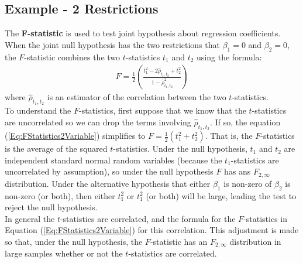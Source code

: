 \subsection{Example - 2 Restrictions}
The \textbf{F-statistic} is used to test joint hypothesis about regression coefficients.\\
When the joint null hypothesis has the two restrictions that $\beta_{1} = 0$ and $\beta_{2} = 0$, the $F$-statistic combines the two $t$-statistics $t_{1}$ and $t_{2}$ using the formula:
\begin{eqnarray}
\label{Eq:FStatistics2Variable}
F = \frac{1}{2}\left(\frac{t_{1}^{2} - 2\hat{\rho}_{t_{1},t_{2}} + t_{2}^{2}}{1  - \hat{\rho}_{t_{1},t_{2}}^{2}}\right)
\end{eqnarray}
where $\hat{\rho}_{t_{1},t_{2}}$ is an estimator of the correlation between the two $t$-statistics.\\
To understand the $F$-statistics, first suppose that we know that the $t$-statistics are uncorrelated so we can drop the terms involving $\hat{\rho}_{t_{1},t_{2}}$. If so, the equation (\ref{Eq:FStatistics2Variable}) simplifies to $F = \frac{1}{2}\left(t_{1}^{2} + t_{2}^{2}\right)$. That is, the $F$-statistics is the average of the squared $t$-statistics. Under the null hypothesis, $t_{1}$ and $t_{2}$ are independent standard normal random variables (because the $t_{1}$-statistics are uncorrelated by assumption), so under the null hypothesis $F$ has ans $F_{2,\infty}$ distribution. Under the alternative hypothesis that either $\beta_{1}$ is non-zero of $\beta_{2}$ is non-zero (or both), then either $t_{1}^{2}$ or $t_{1}^{2}$ (or both) will be large, leading the test to reject the null hypothesis.\\
In general the $t$-statistics are correlated, and the formula for the $F$-statistics in Equation (\ref{Eq:FStatistics2Variable}) for this correlation. This adjustment is made so that, under the null hypothesis, the $F$-statistic has an $F_{2,\infty}$ distribution in large samples whether or not the $t$-statistics are correlated.